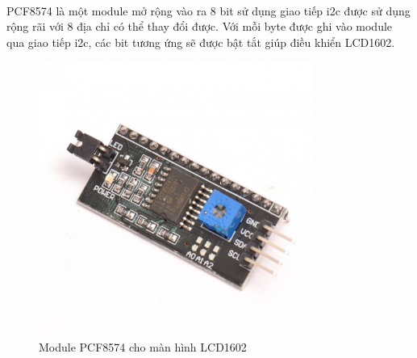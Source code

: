 \paragraph{}
PCF8574 là một module mở rộng vào ra 8 bit sử dụng giao tiếp \acrshort{i2c} được sử dụng rộng rãi với 8 địa chỉ có thể thay đổi được. Với mỗi byte được ghi vào module qua giao tiếp \acrshort{i2c}, các bit tương ứng sẽ được bật tắt giúp điều khiển LCD1602.
\begin{figure}[H]
    \centering
    \includegraphics[width=0.8\textwidth]{images/I2C_PCF.jpg}
    \caption{Module PCF8574 cho màn hình LCD1602}
    \label{fig:enter-label}
\end{figure}